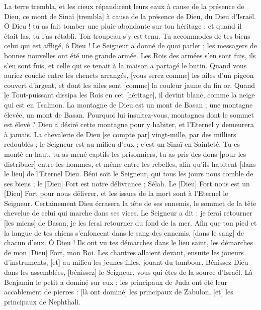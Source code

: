 \begin{multicols}{2}
La terre trembla, et les cieux répandirent leurs eaux à cause de la présence de Dieu, ce mont de Sinaï [trembla] à cause de la présence de Dieu, du Dieu d'Israël.
Ô Dieu ! tu as fait tomber une pluie abondante sur ton héritage ; et quand il était las, tu l'as rétabli.
Ton troupeau s'y est tenu. Tu accommodes de tes biens celui qui est affligé, ô Dieu !
Le Seigneur a donné de quoi parler ; les messagers de bonnes nouvelles ont été une grande armée.
Les Rois des armées s'en sont fuis, ils s'en sont fuis, et celle qui se tenait à la maison a partagé le butin.
Quand vous auriez couché entre les chenets arrangés, [vous serez comme] les ailes d'un pigeon couvert d'argent, et dont les ailes sont [comme] la couleur jaune du fin or.
Quand le Tout-puissant dissipa les Rois en cet [héritage], il devint blanc, comme la neige qui est en Tsalmon.
La montagne de Dieu est un mont de Basan ; une montagne élevée, un mont de Basan.
Pourquoi lui insultez-vous, montagnes dont le sommet est élevé ? Dieu a désiré cette montagne pour y habiter, et l'Eternel y demeurera à jamais.
La chevalerie de Dieu [se compte par] vingt-mille, par des milliers redoublés ; le Seigneur est au milieu d'eux ; c'est un Sinaï en Sainteté.
Tu es monté en haut, tu as mené captifs les prisonniers, tu as pris des dons [pour les distribuer] entre les hommes, et même entre les rebelles, afin qu'ils habitent [dans le lieu] de l'Eternel Dieu.
Béni soit le Seigneur, qui tous les jours nous comble de ses biens ; le [Dieu] Fort est notre délivrance ; Sélah.
Le [Dieu] Fort nous est un [Dieu] Fort pour nous délivrer, et les issues de la mort sont à l'Eternel le Seigneur.
Certainement Dieu écrasera la tête de ses ennemis, le sommet de la tête chevelue de celui qui marche dans ses vices.
Le Seigneur a dit : je ferai retourner [les miens] de Basan, je les ferai retourner du fond de la mer.
Afin que ton pied et la langue de tes chiens s'enfoncent dans le sang des ennemis, [dans le sang] de chacun d'eux.
Ô Dieu ! Ils ont vu tes démarches dans le lieu saint, les démarches de mon [Dieu] Fort, mon Roi.
Les chantres allaient devant, ensuite les joueurs d'instruments, [et] au milieu les jeunes filles, jouant du tambour.
Bénissez Dieu dans les assemblées, [bénissez] le Seigneur, vous qui êtes de la source d'Israël.
Là Benjamin le petit a dominé sur eux ; les principaux de Juda ont été leur accablement de pierres : [là ont dominé] les principaux de Zabulon, [et] les principaux de Nephthali.

\end{multicols}

